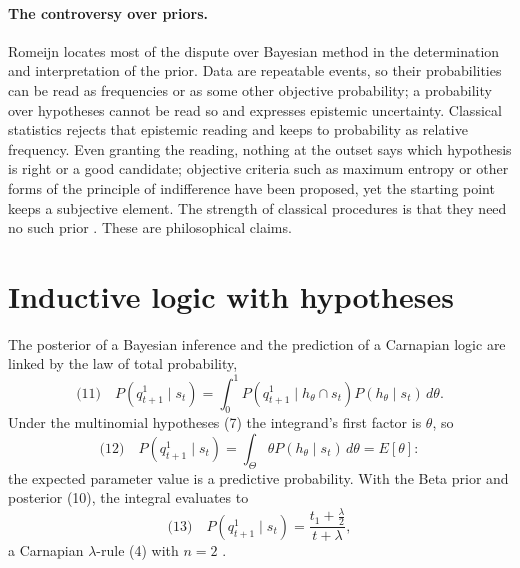 \paragraph{The controversy over priors.}
Romeijn locates most of the dispute over Bayesian method in the
determination and interpretation of the prior. Data are repeatable
events, so their probabilities can be read as frequencies or as some
other objective probability; a probability over hypotheses cannot be
read so and expresses epistemic uncertainty. Classical statistics
rejects that epistemic reading and keeps to probability as relative
frequency. Even granting the reading, nothing at the outset says which
hypothesis is right or a good candidate; objective criteria such as
maximum entropy or other forms of the principle of indifference have
been proposed, yet the starting point keeps a subjective element. The
strength of classical procedures is that they need no such prior
\cite[pp.~634--635]{Romeijn2011InductiveLogicStatistics}. These are
philosophical claims.

\section{Inductive logic with hypotheses}
\label{sec:p15-w02c-p15-029-rj-hypotheses}

The posterior of a Bayesian inference and the prediction of a Carnapian
logic are linked by the law of total probability,
\[
 \text{(11)}\quad P(q^1_{t+1}\mid s_t)=\int_0^1 P(q^1_{t+1}\mid h_\theta\cap s_t)P(h_\theta\mid s_t)\,d\theta .
\]
Under the multinomial hypotheses (7) the integrand's first factor is
\(\theta\), so
\[
 \text{(12)}\quad P(q^1_{t+1}\mid s_t)=\int_\Theta\theta P(h_\theta\mid s_t)\,d\theta=E[\theta]:
\]
the expected parameter value is a predictive probability. With the Beta
prior and posterior (10), the integral evaluates to
\[
 \text{(13)}\quad P(q^1_{t+1}\mid s_t)=\frac{t_1+\frac{\lambda}{2}}{t+\lambda},
\]
a Carnapian \(\lambda\)-rule (4) with \(n=2\)
\cite[p.~635]{Romeijn2011InductiveLogicStatistics}.

